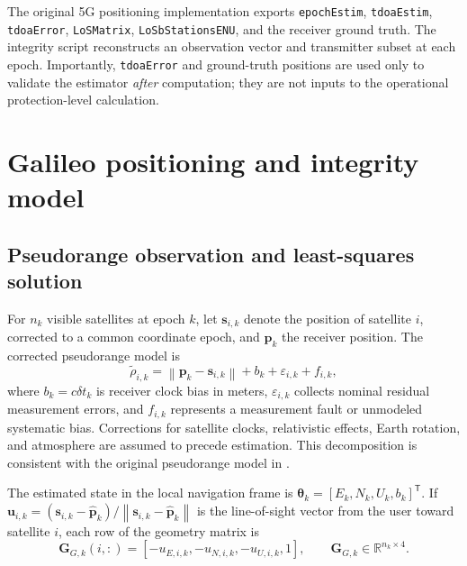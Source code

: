 \documentclass[pdflatex,sn-mathphys-num]{sn-jnl}
\newcommand{\vect}[1]{\boldsymbol{#1}}
\newcommand{\mat}[1]{\mathbf{#1}}
\newcommand{\norm}[1]{\left\lVert #1\right\rVert}
\newcommand{\trans}{^{\mathsf T}}
\begin{document}
The original 5G positioning implementation exports
\texttt{epochEstim}, \texttt{tdoaEstim}, \texttt{tdoaError},
\texttt{LoSMatrix}, \texttt{LoSbStationsENU}, and the receiver ground truth.
The integrity script reconstructs an observation vector and transmitter
subset at each epoch. Importantly, \texttt{tdoaError} and ground-truth
positions are used only to validate the estimator \emph{after} computation;
they are not inputs to the operational protection-level calculation.

\section{Galileo positioning and integrity model}\label{sec:galileo}

\subsection{Pseudorange observation and least-squares solution}

For $n_k$ visible satellites at epoch $k$, let $\vect{s}_{i,k}$ denote
the position of satellite $i$, corrected to a common coordinate epoch, and
$\vect{p}_k$ the receiver position. The corrected pseudorange model is
\begin{equation}\label{eq:gnss-obs}
 \tilde\rho_{i,k}=\norm{\vect{p}_k-\vect{s}_{i,k}}+b_k
 +\varepsilon_{i,k}+f_{i,k},
\end{equation}
where $b_k=c\delta t_k$ is receiver clock bias in meters,
$\varepsilon_{i,k}$ collects nominal residual measurement errors, and
$f_{i,k}$ represents a measurement fault or unmodeled systematic bias.
Corrections for satellite clocks, relativistic effects, Earth rotation,
and atmosphere are assumed to precede estimation. This decomposition is
consistent with the original pseudorange model in
\cite{SanchezHerederoThesis}.

The estimated state in the local navigation frame is
$\vect{\theta}_k=[E_k,N_k,U_k,b_k]\trans$. If
$\vect{u}_{i,k}=(\vect{s}_{i,k}-\hat{\vect{p}}_k)/
\norm{\vect{s}_{i,k}-\hat{\vect{p}}_k}$ is the line-of-sight vector
from the user toward satellite $i$, each row of the geometry matrix is
\begin{equation}\label{eq:Ggnss}
 \mat{G}_{G,k}(i,:)=[-u_{E,i,k},-u_{N,i,k},-u_{U,i,k},1],
 \qquad \mat{G}_{G,k}\in\mathbb{R}^{n_k\times4}.
\end{equation}
\end{document}
